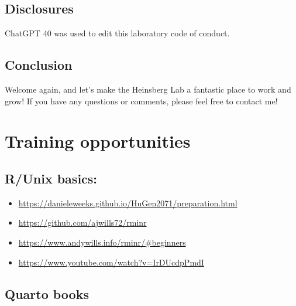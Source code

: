 \documentclass[
  letterpaper,
  DIV=11,
  numbers=noendperiod]{scrreprt}
\providecommand{\tightlist}{%
  \setlength{\itemsep}{0pt}\setlength{\parskip}{0pt}}\usepackage{longtable,booktabs,array}
\begin{document}
\section*{Disclosures}\label{disclosures}


ChatGPT 40 was used to edit this laboratory code of conduct.

\section*{Conclusion}\label{conclusion}


Welcome again, and let's make the Heinsberg Lab a fantastic place to
work and grow! If you have any questions or comments, please feel free
to contact me!


\chapter*{Training opportunities}\label{training-opportunities}


\section*{R/Unix basics:}\label{runix-basics}


\begin{itemize}
\tightlist
\item
  \url{https://danieleweeks.github.io/HuGen2071/preparation.html}
\item
  \url{https://github.com/ajwills72/rminr}
\item
  \url{https://www.andywills.info/rminr/\#beginners}
\item
  \url{https://www.youtube.com/watch?v=IrDUcdpPmdI}
\end{itemize}

\section*{Quarto books}\label{quarto-books}
\end{document}
